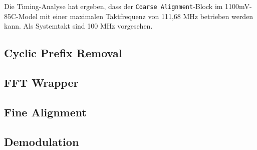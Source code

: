Die Timing-Analyse hat ergeben, dass der \texttt{Coarse Alignment}-Block im 1100mV-85C-Model mit einer maximalen Taktfrequenz von 111,68 MHz betrieben werden kann. Als Systemtakt sind 100 MHz vorgesehen.

\subsection{Cyclic Prefix Removal}

\subsection{FFT Wrapper}

\subsection{Fine Alignment}

\subsection{Demodulation}






